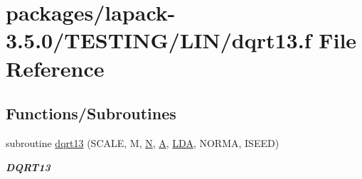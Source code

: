 \hypertarget{dqrt13_8f}{}\section{packages/lapack-\/3.5.0/\+T\+E\+S\+T\+I\+N\+G/\+L\+I\+N/dqrt13.f File Reference}
\label{dqrt13_8f}
\subsection*{Functions/\+Subroutines}
\begin{DoxyCompactItemize}
\item 
subroutine \hyperlink{group__double__lin_ga5e9d0310254a3d894adcb0a294e35929}{dqrt13} (S\+C\+A\+L\+E, M, \hyperlink{polmisc_8c_a0240ac851181b84ac374872dc5434ee4}{N}, \hyperlink{classA}{A}, \hyperlink{example__user_8c_ae946da542ce0db94dced19b2ecefd1aa}{L\+D\+A}, N\+O\+R\+M\+A, I\+S\+E\+E\+D)
\begin{DoxyCompactList}\small\item\em {\bfseries D\+Q\+R\+T13} \end{DoxyCompactList}\end{DoxyCompactItemize}

